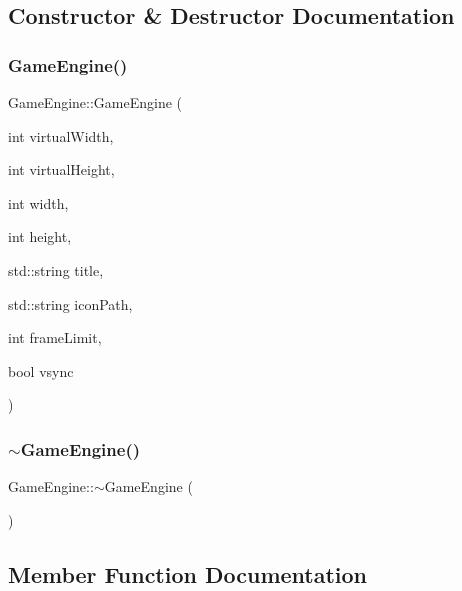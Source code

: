 \subsection{Constructor \& Destructor Documentation}
\mbox{\label{class_game_engine_a5365f65c15fa45ab2f6e4e661f6fbd5f}} 
\subsubsection{\texorpdfstring{GameEngine()}{GameEngine()}}
{\footnotesize\ttfamily Game\+Engine\+::\+Game\+Engine (\begin{DoxyParamCaption}\item[{int}]{virtual\+Width,  }\item[{int}]{virtual\+Height,  }\item[{int}]{width,  }\item[{int}]{height,  }\item[{std\+::string}]{title,  }\item[{std\+::string}]{icon\+Path,  }\item[{int}]{frame\+Limit,  }\item[{bool}]{vsync }\end{DoxyParamCaption})}

\mbox{\label{class_game_engine_a8e59d8341ef9d2dcc62eee1437e37f14}} 
\subsubsection{\texorpdfstring{$\sim$GameEngine()}{~GameEngine()}}
{\footnotesize\ttfamily Game\+Engine\+::$\sim$\+Game\+Engine (\begin{DoxyParamCaption}{ }\end{DoxyParamCaption})}



\subsection{Member Function Documentation}
\mbox{\label{class_game_engine_a2a83394496e5c9060b9f8ddb5a7abd24}} 
